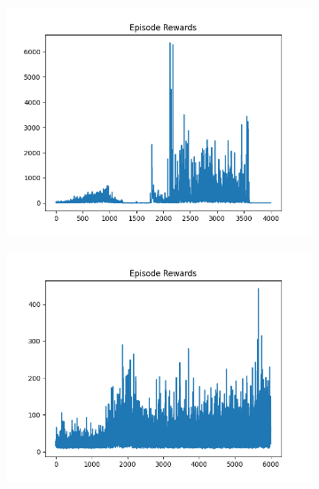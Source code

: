 \begin{figure}[H]
    \centering
    \begin{subfigure}{.47\linewidth}
        \centering
        \includegraphics[width=\textwidth]{pole/2024-06-14_13-15-56_dqn_cartpole_episode_rewards.png}
    \end{subfigure}
    \begin{subfigure}{.47\linewidth}
        \centering
        \includegraphics[width=\textwidth]{pole/2024-06-14_18-17-10_dqn_cartpole_episode_rewards.png}
    \end{subfigure}
    \begin{subfigure}{.47\linewidth}
        \centering

\end{subfigure}
\end{figure}

